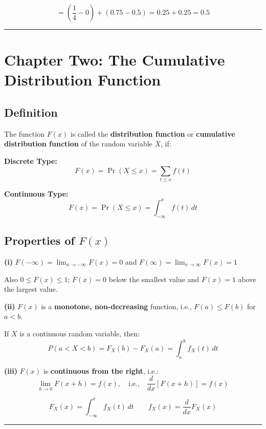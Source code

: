 \documentclass[
]{article}
\begin{document}
\[= \left(\frac{1}{4} - 0\right) + (0.75 - 0.5) = 0.25 + 0.25 = 0.5\]

\begin{center}\rule{0.5\linewidth}{0.5pt}\end{center}

\section{Chapter Two: The Cumulative Distribution
Function}\label{chapter-two-the-cumulative-distribution-function}

\subsection{Definition}\label{definition}

The function \(F(x)\) is called the \textbf{distribution function} or
\textbf{cumulative distribution function} of the random variable \(X\),
if:

\textbf{Discrete Type:} \[F(x) = \Pr(X \leq x) = \sum_{t \leq x} f(t)\]

\textbf{Continuous Type:}
\[F(x) = \Pr(X \leq x) = \int_{-\infty}^{x} f(t)\,dt\]

\subsection{\texorpdfstring{Properties of
\(F(x)\)}{Properties of F(x)}}\label{properties-of-fx}

\textbf{(i)} \(F(-\infty) = \lim_{x \to -\infty} F(x) = 0\) and
\(F(\infty) = \lim_{x \to \infty} F(x) = 1\)

Also \(0 \leq F(x) \leq 1\); \(F(x) = 0\) below the smallest value and
\(F(x) = 1\) above the largest value.

\textbf{(ii)} \(F(x)\) is a \textbf{monotone, non-decreasing} function,
i.e., \(F(a) \leq F(b)\) for \(a < b\).

If \(X\) is a continuous random variable, then:
\[P(a < X < b) = F_X(b) - F_X(a) = \int_a^b f_X(t)\,dt\]

\textbf{(iii)} \(F(x)\) is \textbf{continuous from the right}, i.e.:
\[\lim_{h \to 0} F(x+h) = f(x),\quad \text{i.e.,}\quad \frac{d}{dx}\left[F(x+h)\right] = f(x)\]

\[F_X(x) = \int_{-\infty}^{x} f_X(t)\,dt \qquad f_X(x) = \frac{d}{dx}F_X(x)\]

\begin{center}\rule{0.5\linewidth}{0.5pt}\end{center}
\end{document}
